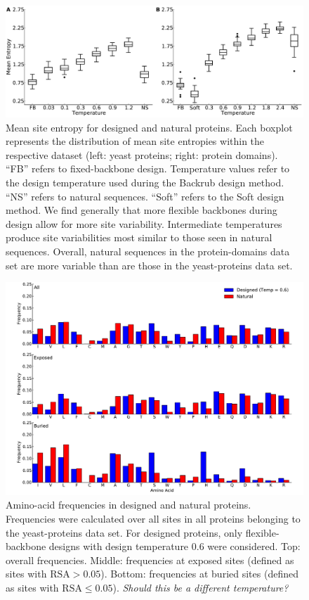 \documentclass[12pt]{article}
\begin{document}
\begin{figure}[H]
\centerline{\includegraphics[width = 6in]{figures/Mean_Entropy_vs_Temp_Combo_Boxplot.pdf}} %
\caption{Mean site entropy for designed and natural proteins. Each boxplot represents the distribution of mean site entropies within the respective dataset (left: yeast proteins; right: protein domains). ``FB'' refers to fixed-backbone design. Temperature values refer to the design temperature used during the Backrub design method. ``NS'' refers to natural sequences. ``Soft'' refers to the Soft design method. We find generally that more flexible backbones during design allow for more site variability. {\color{red}Intermediate temperatures produce site variabilities most similar to those seen in natural sequences.} Overall, natural sequences in the protein-domains data set are more variable than are those in the yeast-proteins data set.}
\label{MeanEntropyComparison}
\end{figure}


\begin{figure}[H]
\centerline{\includegraphics[width = 5in]{figures/Duncan_Freq_Combo_Plots_06.pdf}}
\caption{Amino-acid frequencies in designed and natural proteins. Frequencies were calculated over all sites in all proteins belonging to the yeast-proteins data set. For designed proteins, only flexible-backbone designs with design temperature 0.6 were considered. Top: overall frequencies. Middle: frequencies at exposed sites (defined as sites with $\text{RSA}>0.05$). Bottom: frequencies at buried sites (defined as sites with $\text{RSA}\leq0.05$). {\color{red}\emph{Should this be a different temperature?} }  }
\label{AAFreqsYeastProteins}
\end{figure}
\end{document}
